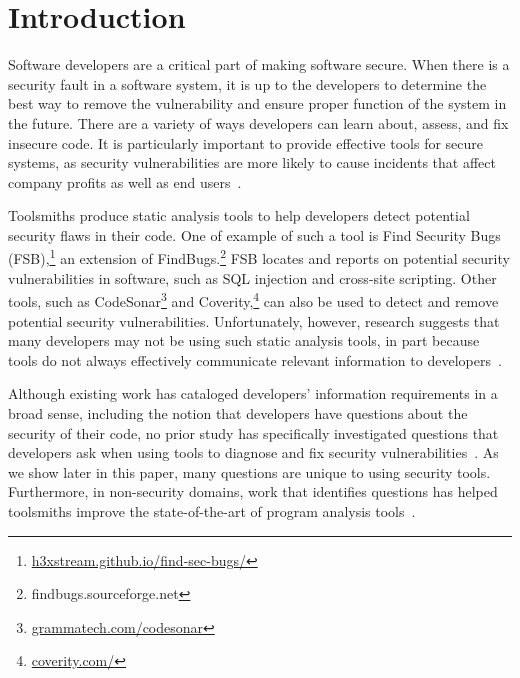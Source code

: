 \documentclass[conference]{IEEEtran}
\begin{document}
\section{Introduction}

Software developers are a critical part of making software secure. 
When there is a security fault in a software system, it is up to the developers to determine the best way to remove the vulnerability and ensure proper function of the system in the future.
There are a variety of ways developers can learn about, assess, and fix insecure code.
It is particularly important to provide effective tools for secure systems, as security vulnerabilities are more likely to cause incidents that affect company profits as well as end users~\cite{chen2002mops}. 

Toolsmiths produce static analysis tools to help developers detect potential security flaws in their code. 
One of example of such a tool is Find Security Bugs (FSB),\footnote{\url{h3xstream.github.io/find-sec-bugs/}} an extension of FindBugs.\footnote{findbugs.sourceforge.net} 
FSB locates and reports on potential security vulnerabilities in software, such as SQL injection and cross-site scripting.  
Other tools, such as CodeSonar\footnote{\url{grammatech.com/codesonar}} and Coverity,\footnote{\url{coverity.com/}} can also be used to detect and remove potential security vulnerabilities.
Unfortunately, however, research suggests that many developers may not be using such static analysis tools, in part because tools do not always effectively communicate relevant information to developers~\cite{johnson2013don}. 


Although existing work has cataloged developers' information requirements in a broad sense, including the notion that developers have questions about the security of their code, no prior study has specifically investigated questions that developers ask when using tools to diagnose and fix security vulnerabilities~\cite{latoza2010hard}. 
As we show later in this paper, many questions are unique to using security tools.
Furthermore, in non-security domains, work that identifies questions has helped toolsmiths improve the state-of-the-art of program analysis tools~\cite{kononenko2012automatically, servant2012history, yoon2013visualization}. 


\end{document}
